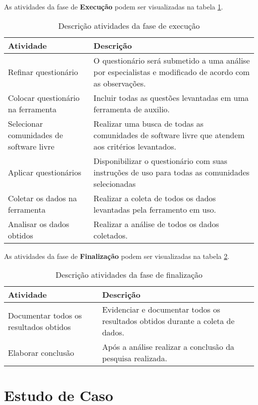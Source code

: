 As atividades da fase de \textbf{Execução} podem ser visualizadas na tabela \ref{tab:fas-atv-exec}.

\begin{table}[H]
\center
\begin{tabular}{|l|p{8cm}|}
\hline
\textbf{Atividade} & \textbf{Descrição} \\ \hline
		Refinar questionário & O questionário será submetido a uma análise por especialistas e modificado de acordo com as observações.\\ \hline
		Colocar questionário na ferramenta & Incluir todas as questões levantadas em uma ferramenta de auxilio.\\ \hline
		Selecionar comunidades de software livre & Realizar uma busca de todas as comunidades de software livre que atendem aos critérios levantados. \\ \hline
		Aplicar questionários & Disponibilizar o questionário com suas instruções de uso para todas as comunidades selecionadas \\ \hline
		Coletar os dados na ferramenta & Realizar a coleta de todos os dados levantadas pela ferramento em uso. \\ \hline
		Analisar os dados obtidos & Realizar a análise de todos os dados coletados. \\ \hline
\end{tabular}
\caption{Descrição atividades da fase de execução}
\label{tab:fas-atv-exec}
\end{table}

As atividades da fase de \textbf{Finalização} podem ser visualizadas na tabela \ref{tab:fas-atv-fin}.

\begin{table}[H]
\center
\begin{tabular}{|l|p{8cm}|}
\hline
\textbf{Atividade} & \textbf{Descrição} \\ \hline
		Documentar todos os resultados obtidos & Evidenciar e documentar todos os resultados obtidos durante a coleta de dados. \\ \hline
		Elaborar conclusão & Após a análise realizar a conclusão da pesquisa realizada. \\ \hline
\end{tabular}
\caption{Descrição atividades da fase de finalização}
\label{tab:fas-atv-fin}
\end{table}

\section{Estudo de Caso}

